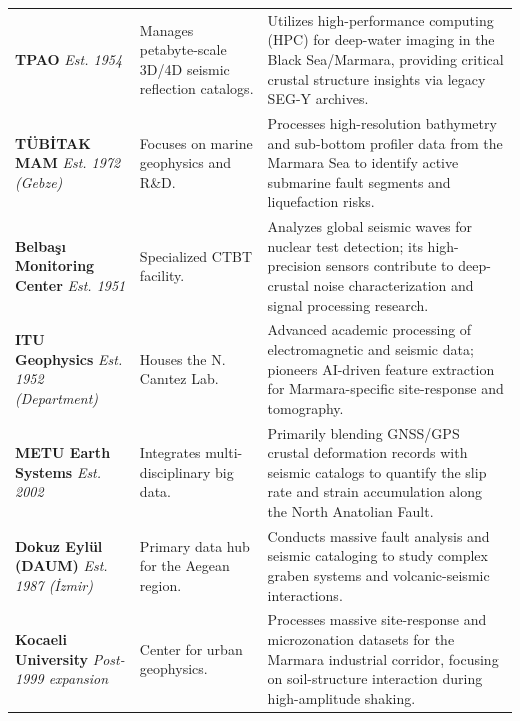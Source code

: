 \documentclass[data,article,submit,pdftex,moreauthors]{Definitions/mdpi}
\begin{document}
\begin{tabularx}{\textwidth}{@{} 
    >{\hsize=0.6\hsize\raggedright\arraybackslash}X 
    >{\hsize=0.8\hsize\raggedright\arraybackslash}X 
    >{\hsize=1.6\hsize\raggedright\arraybackslash}X 
@{}}
    \textbf{TPAO} \newline \textit{Est. 1954} & Manages petabyte-scale 3D/4D seismic reflection catalogs. & Utilizes high-performance computing (HPC) for deep-water imaging in the Black Sea/Marmara, providing critical crustal structure insights via legacy SEG-Y archives. \\ \addlinespace
    
    \textbf{TÜBİTAK MAM} \newline \textit{Est. 1972 (Gebze)} & Focuses on marine geophysics and R\&D. & Processes high-resolution bathymetry and sub-bottom profiler data from the Marmara Sea to identify active submarine fault segments and liquefaction risks. \\ \addlinespace
    
    \textbf{Belbaşı Monitoring Center} \newline \textit{Est. 1951} & Specialized CTBT facility. & Analyzes global seismic waves for nuclear test detection; its high-precision sensors contribute to deep-crustal noise characterization and signal processing research. \\ \addlinespace
    
    \textbf{ITU Geophysics} \newline \textit{Est. 1952 (Department)} & Houses the N. Canıtez Lab. & Advanced academic processing of electromagnetic and seismic data; pioneers AI-driven feature extraction for Marmara-specific site-response and tomography. \\ \addlinespace
    
    \textbf{METU Earth Systems} \newline \textit{Est. 2002} & Integrates multi-disciplinary big data. & Primarily blending GNSS/GPS crustal deformation records with seismic catalogs to quantify the slip rate and strain accumulation along the North Anatolian Fault. \\ \addlinespace
    
    \textbf{Dokuz Eylül (DAUM)} \newline \textit{Est. 1987 (İzmir)} & Primary data hub for the Aegean region. & Conducts massive fault analysis and seismic cataloging to study complex graben systems and volcanic-seismic interactions. \\ \addlinespace
    
    \textbf{Kocaeli University} \newline \textit{Post-1999 expansion} & Center for urban geophysics. & Processes massive site-response and microzonation datasets for the Marmara industrial corridor, focusing on soil-structure interaction during high-amplitude shaking. \\ 

\end{tabularx}
\end{document}
